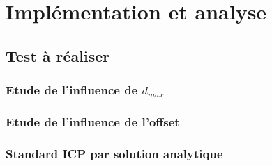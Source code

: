 \section{Implémentation et analyse}

\subsection{Test à réaliser}
\subsubsection{Etude de l'influence de $d_{max}$}
\subsubsection{Etude de l'influence de l'offset}
\subsubsection{Standard ICP par solution analytique}